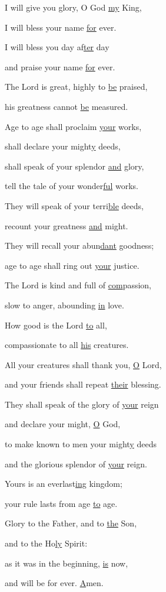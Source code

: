 \noindent I will give you glory, O God \uline{my} King,~\GreStar{}~\nopagebreak

I will bless your name \uline{for} ever.

\noindent I will bless you day af\uline{ter} day~\GreStar{}~\nopagebreak

and praise your name \uline{for} ever.

\noindent The Lord is great, highly to \uline{be} praised,~\GreStar{}~\nopagebreak

his greatness cannot \uline{be} measured.

\noindent Age to age shall proclaim \uline{your} works,~\GreStar{}~\nopagebreak

shall declare your might\uline{y} deeds,

\noindent shall speak of your splendor \uline{and} glory,~\GreStar{}~\nopagebreak

tell the tale of your wonder\uline{ful} works.

\noindent They will speak of your terri\uline{ble} deeds,~\GreStar{}~\nopagebreak

recount your greatness \uline{and} might.

\noindent They will recall your abun\uline{dant} goodness;~\GreStar{}~\nopagebreak

age to age shall ring out \uline{your} justice.

\noindent The Lord is kind and full of \uline{com}passion,~\GreStar{}~\nopagebreak

slow to anger, abounding \uline{in} love.

\noindent How good is the Lord \uline{to} all,~\GreStar{}~\nopagebreak

compassionate to all \uline{his} creatures.

\noindent All your creatures shall thank you, \uline{O} Lord,~\GreStar{}~\nopagebreak

and your friends shall repeat \uline{their} blessing.

\noindent They shall speak of the glory of \uline{your} reign~\GreStar{}~\nopagebreak

and declare your might, \uline{O} God,

\noindent to make known to men your might\uline{y} deeds~\GreStar{}~\nopagebreak

and the glorious splendor of \uline{your} reign.

\noindent Yours is an everlast\uline{ing} kingdom;~\GreStar{}~\nopagebreak

your rule lasts from age \uline{to} age.

\noindent Glory to the Father, and to \uline{the} Son,~\GreStar{}~\nopagebreak

and to the Ho\uline{ly} Spirit:

\noindent as it was in the beginning, \uline{is} now,~\GreStar{}~\nopagebreak

and will be for ever. \uline{A}men.
